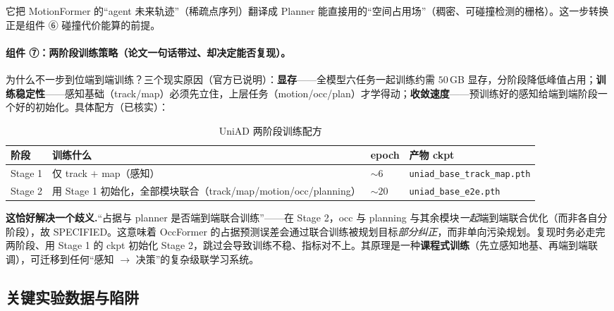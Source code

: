 \begin{insight}
它把 MotionFormer 的“agent 未来轨迹”（稀疏点序列）翻译成 Planner 能直接用的“空间占用场”（稠密、可碰撞检测的栅格）。这一步转换正是组件 ⑥ 碰撞代价能算的前提。
\end{insight}

\paragraph{组件 ⑦：两阶段训练策略（论文一句话带过、却决定能否复现）。}
为什么不一步到位端到端训练？三个现实原因（官方已说明）：\textbf{显存}——全模型六任务一起训练约需 $50$\,GB 显存，分阶段降低峰值占用；\textbf{训练稳定性}——感知基础（track/map）必须先立住，上层任务（motion/occ/plan）才学得动；\textbf{收敛速度}——预训练好的感知给端到端阶段一个好的初始化。具体配方（已核实）：

\begin{table}[H]\centering\small
\caption{UniAD 两阶段训练配方}
\label{tab:de-uniad-stages}
\begin{tabular}{p{} p{} p{} p{}}
\toprule
阶段 & 训练什么 & epoch & 产物 ckpt \\
\midrule
Stage 1 & 仅 track $+$ map（感知） & $\sim 6$ & \texttt{uniad\_base\_track\_map.\allowbreak pth} \\
Stage 2 & 用 Stage 1 初始化，全部模块联合（track/map/motion/occ/planning） & $\sim 20$ & \texttt{uniad\_base\_e2e.\allowbreak pth} \\
\bottomrule
\end{tabular}
\end{table}

\begin{note}
\textbf{这恰好解决一个歧义.}\;“占据与 planner 是否端到端联合训练”——在 Stage 2，occ 与 planning 与其余模块\emph{一起}端到端联合优化（而非各自分阶段），故 SPECIFIED。这意味着 OccFormer 的占据预测误差会通过联合训练被规划目标\emph{部分纠正}，而非单向污染规划。复现时务必走完两阶段、用 Stage 1 的 ckpt 初始化 Stage 2，跳过会导致训练不稳、指标对不上。其原理是一种\textbf{课程式训练}（先立感知地基、再端到端联调），可迁移到任何“感知 $\to$ 决策”的复杂级联学习系统。
\end{note}

\subsection{关键实验数据与陷阱}
\label{sec:de-uniad-exp}

